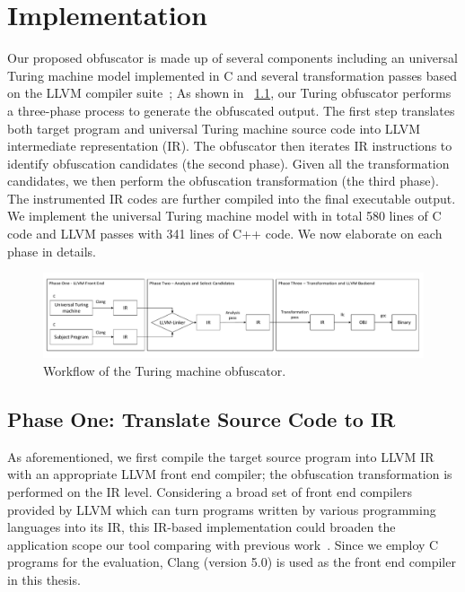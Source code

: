 \chapter{Implementation}
Our proposed obfuscator is made up of several components including an universal
Turing machine model implemented in C and several transformation passes based on
the LLVM compiler suite~\cite{LLVM}; As shown in \F~\ref{fig:five}, our Turing
obfuscator performs a three-phase process to generate the obfuscated output. The
first step translates both target program and universal Turing machine source code into LLVM
intermediate representation (IR). The obfuscator then iterates IR instructions
to identify obfuscation candidates (the second phase). Given all the
transformation candidates, we then perform the obfuscation transformation (the
third phase). The instrumented IR codes are further compiled into the final
executable output. We implement the universal Turing machine model with in total
580 lines of C code and LLVM passes with 341 lines of C++ code. We now
elaborate on each phase in details.

\begin{figure}
 \includegraphics[width=\linewidth]{overview.pdf}
 \caption{Workflow of the Turing machine obfuscator.}
 \label{fig:five}
\end{figure}

\section{Phase One: Translate Source Code to IR}
\label{subsec:phase-one}
As aforementioned, we first compile the target source program into LLVM IR with
an appropriate LLVM front end compiler; the obfuscation transformation is
performed on the IR level. Considering a broad set of front end compilers
provided by LLVM which can turn programs written by various programming
languages into its IR, this IR-based implementation could broaden the
application scope our tool comparing with previous work~\cite{Ma, Zhi, Maieee}.
Since we employ C programs for the evaluation, Clang (version 5.0) is used as
the front end compiler in this thesis.

